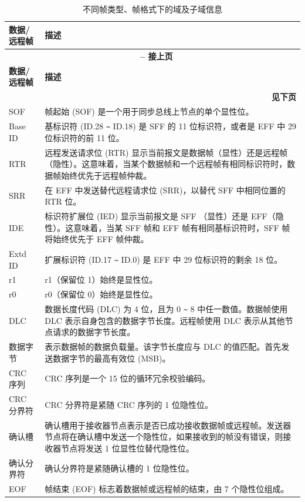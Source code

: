 \begin{longtable}[c]{|p{3.5cm}|p{12cm}|} 
    
  \caption{不同帧类型、帧格式下的域及子域信息}
  \label{tab:twai-data-frames-and-remote-frames} 
  \\\hline
  \rowcolor{lightgray}
  \textbf{数据/远程帧} & \textbf{描述}
  \\\hline
  \endfirsthead
  
  \multicolumn{2}{c}{\bfseries \tablename\ \thetable{} -- 接上页}\\  \hline
  
  \rowcolor{lightgray}
    \textbf{数据/远程帧} & \textbf{描述}
  \\\hline
  \endhead
  
  \multicolumn{2}{r}{\textbf{见下页}} \\
  \endfoot
  \endlastfoot
  
    SOF & 帧起始 (SOF) 是一个用于同步总线上节点的单个显性位。
          \\\hline
    Base ID & 基标识符 (ID.28 \verb+~+ ID.18) 是 SFF 的 11 位标识符，或者是 EFF 中 29 位标识符的前 11 位。
          \\\hline
    RTR & 远程发送请求位 (RTR) 显示当前报文是数据帧（显性）还是远程帧（隐性）。这意味着，当某个数据帧和一个远程帧有相同标识符时，数据帧始终优先于远程帧仲裁。                                                    \\\hline
    SRR & 在 EFF 中发送替代远程请求位 (SRR)，以替代 SFF 中相同位置的 RTR 位。                       
           \\\hline
    IDE & 标识符扩展位 (IED) 显示当前报文是 SFF （显性）还是 EFF（隐性）。这意味着，当某 SFF 帧和 EFF 帧有相同基标识符时，SFF 帧将始终优先于 EFF 帧仲裁。              \\\hline
    Extd ID & 扩展标识符 (ID.17 \verb+~+ ID.0) 是 EFF 中 29 位标识符的剩余 18 位。                                     \\\hline
    r1 & r1（保留位 1）始终是显性位。
             \\\hline 
    r0 & r0（保留位 0）始终是显性位。
             \\\hline
    DLC & 数据长度代码 (DLC) 为 4 位，且为 0 \verb+~+ 8 中任一数值。数据帧使用 DLC 表示自身包含的数据字节长度。远程帧使用 DLC 表示从其他节点请求的数据字节长度。 
             \\\hline
    数据字节 & 表示数据帧的数据负载量。该字节长度应与 DLC 的值匹配。首先发送数据字节的最高有效位 (MSB)。
             \\\hline
    CRC 序列 & CRC 序列是一个 15 位的循环冗余校验编码。
             \\\hline
    CRC 分界符 & CRC 分界符是紧随 CRC 序列的 1 位隐性位。
              \\\hline
    确认槽 & 确认槽用于接收器节点表示是否已成功接收数据帧或远程帧。发送器节点将在确认槽中发送一个隐性位，如果接收到的帧没有错误，则接收器节点将发送 1 位显性位替代隐性位。
              \\\hline
    确认分界符 & 确认分界符是紧随确认槽的 1 位隐性位。
              \\\hline
    EOF & 帧结束 (EOF) 标志着数据帧或远程帧的结束，由 7 个隐性位组成。
              \\\hline
\end{longtable}